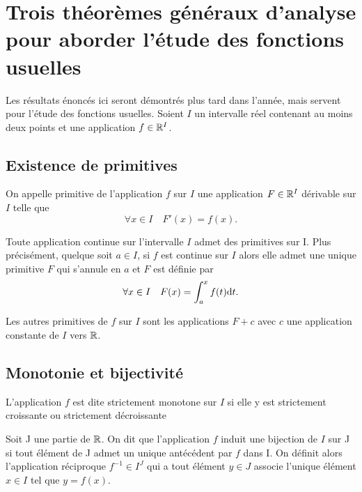 \chapter{Trois théorèmes généraux d'analyse pour aborder l'étude des fonctions 
usuelles}
\label{chap:theogen}
Les résultats énoncés ici seront démontrés plus tard dans l'année, mais servent 
pour l'étude des fonctions usuelles. Soient \(I\) un intervalle réel contenant 
au moins deux points et une application \(f \in \mathbb{R}^I\).

\section{Existence de primitives}

\begin{defdef}
  On appelle primitive de l'application \(f\) sur \(I\) une application \(F \in 
  \mathbb{R}^I\) dérivable sur \(I\) telle que
  \begin{equation}
    \forall x \in I \quad F'(x)=f(x).
  \end{equation}
\end{defdef}
\begin{theo}
  Toute application continue sur l'intervalle \(I\) admet des primitives sur I. 
  Plus précisément, quelque soit \(a \in I\), si \(f\) est continue sur \(I\) 
  alors elle admet une unique primitive \(F\) qui s'annule en \(a\) et \(F\) est 
  définie par
  \begin{equation}
    \forall x \in I \quad F(x)=\int_{a}^x f(t) \mathrm{d} t.
  \end{equation}
\end{theo}
Les autres primitives de \(f\) sur \(I\) sont les applications \(F+c\) avec 
\(c\) une application constante de \(I\) vers \(\mathbb{R}\).

\section{Monotonie et bijectivité}

\begin{defdef}
  L'application \(f\) est dite strictement monotone sur \(I\) si elle y est 
  strictement croissante ou strictement décroissante
\end{defdef}

\begin{defdef}
  Soit J une partie de \(\mathbb{R}\). On dit que l'application \(f\) induit une 
  bijection de \(I\) sur J si tout élément de J admet un unique antécédent par 
  \(f\) dans I. On définit alors l'application réciproque \(f^{-1} \in I^J\) qui 
  a tout élément \(y \in J\) associe l'unique élément \(x \in I\) tel que 
  \(y=f(x)\).
\end{defdef}

